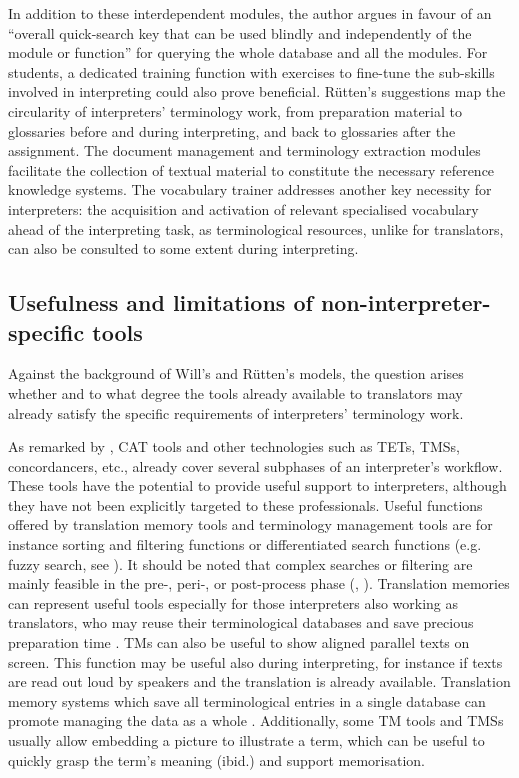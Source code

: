 In addition to these interdependent modules, the author argues in favour of an ``overall quick-search key that can be used blindly and independently of the module or function'' \citep[175]{rutten_why_2004} for querying the whole database and all the modules. For students, a dedicated training function with exercises to fine-tune the sub-skills involved in interpreting could also prove beneficial. Rütten's suggestions map the circularity of interpreters' terminology work, from preparation material to glossaries before and during interpreting, and back to glossaries after the assignment. The document management and terminology extraction modules facilitate the collection of textual material to constitute the necessary reference knowledge systems. The vocabulary trainer addresses another key necessity for interpreters: the acquisition and activation of relevant specialised vocabulary ahead of the interpreting task, as terminological resources, unlike for translators, can also be consulted to some extent during interpreting.

\subsection{Usefulness and limitations of non-interpreter-specific tools} \label{proconstools}
\begin{sloppypar}
Against the background of Will's and Rütten's models, the question arises whether and to what degree the tools already available to translators may already satisfy the specific requirements of interpreters' terminology work.
\end{sloppypar}

As remarked by \citet[43]{rutten2011TMS}, CAT tools and other technologies such as TETs, TMSs, concordancers, etc., already cover several subphases of an interpreter's workflow. These tools have the potential to provide useful support to interpreters, although they have not been explicitly targeted to these professionals.
Useful functions offered by translation memory tools and terminology management tools are for instance sorting and filtering functions or differentiated search functions (e.g. fuzzy search, see \citealt[43]{rutten2011TMS}). It should be noted that complex searches or filtering are mainly feasible in the pre-, peri-, or post-process phase (\citealt[50]{rutten2013TM}, \citealt[8]{wagener2012vorbereitende}). Translation memories can represent useful tools especially for those interpreters also working as translators, who may reuse their terminological databases and save precious preparation time \citep[49]{rutten2013TM}. TMs can also be useful to show aligned parallel texts on screen. This function may be useful also during interpreting, for instance if texts are read out loud by speakers and the translation is already available. Translation memory systems which save all terminological entries in a single database can promote managing the data as a whole \citep[44]{rutten2012TM}. Additionally, some TM tools and TMSs usually allow embedding a picture to illustrate a term, which can be useful to quickly grasp the term's meaning (ibid.) and support memorisation.

